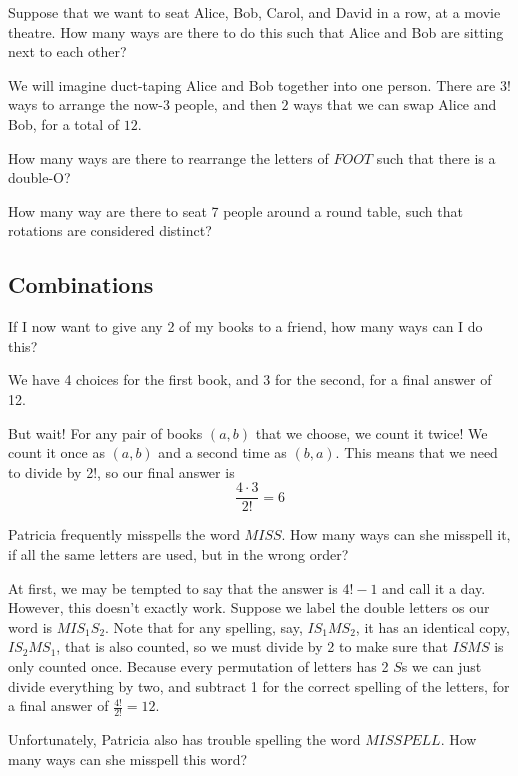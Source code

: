 \documentclass{scrartcl}
\begin{document}
	\begin{example}
		Suppose that we want to seat Alice, Bob, Carol, and David in a row, at a movie theatre. How many ways are there to do this such that Alice and Bob are sitting next to each other?
	\end{example}
	\begin{soln}
		We will imagine duct-taping Alice and Bob together into one person. There are $3!$ ways to arrange the now-3 people, and then $2$ ways that we can swap Alice and Bob, for a total of $\boxed{12}$.
	\end{soln}
	\begin{exercise}
		How many ways are there to rearrange the letters of $FOOT$ such that there is a double-O?
	\end{exercise}
	\begin{exercise}
		How many way are there to seat 7 people around a round table, such that rotations are considered distinct?
	\end{exercise}
	
	\subsection{Combinations}
	\begin{example}
		If I now want to give any 2 of my books to a friend, how many ways can I do this?
	\end{example}
	\begin{soln}
		We have 4 choices for the first book, and 3 for the second, for a final answer of 12.

		But wait! For any pair of books $(a,b)$ that we choose, we count it twice! We count it once as $(a,b)$ and a second time as $(b,a)$. This means that we need to divide by 2!, so our final answer is 
		\[\frac{4 \cdot 3}{2!} = \boxed{6}\]
	\end{soln}

	\begin{example} 
		Patricia frequently misspells the word $MISS$. How many ways can she misspell it, if all the same letters are used, but in the wrong order?
	\end{example}
	\begin{soln}
		At first, we may be tempted to say that the answer is $4!-1$ and call it a day. However, this doesn't exactly work. Suppose we label the double letters os our word is $MIS_1S_2$. Note that for any spelling, say, $IS_1MS_2$, it has an identical copy, $IS_2MS_1$, that is also counted, so we must divide by 2 to make sure that $ISMS$ is only counted once. Because every permutation of letters has 2 $S$s we can just divide everything by two, and subtract 1 for the correct spelling of the letters, for a final answer of $\frac{4!}{2!} = 12$.
	\end{soln}
	\begin{exercise}
		Unfortunately, Patricia also has trouble spelling the word $MISSPELL$. How many ways can she misspell this word?
	\end{exercise}
\end{document}
